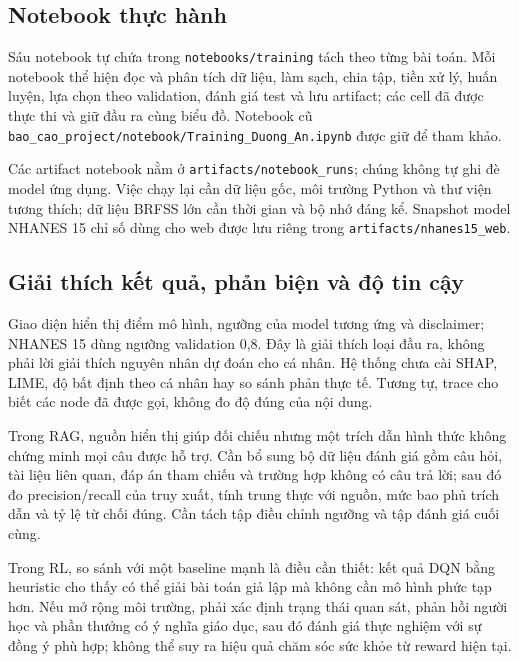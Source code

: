 \subsection{Notebook thực hành}
Sáu notebook tự chứa trong \texttt{notebooks/training} tách theo từng bài toán. Mỗi notebook thể hiện đọc và phân tích dữ liệu, làm sạch, chia tập, tiền xử lý, huấn luyện, lựa chọn theo validation, đánh giá test và lưu artifact; các cell đã được thực thi và giữ đầu ra cùng biểu đồ. Notebook cũ \texttt{bao\_cao\_project/notebook/Training\_Duong\_An.ipynb} được giữ để tham khảo.

Các artifact notebook nằm ở \texttt{artifacts/notebook\_runs}; chúng không tự ghi đè model ứng dụng. Việc chạy lại cần dữ liệu gốc, môi trường Python và thư viện tương thích; dữ liệu BRFSS lớn cần thời gian và bộ nhớ đáng kể. Snapshot model NHANES 15 chỉ số dùng cho web được lưu riêng trong \texttt{artifacts/nhanes15\_web}.

\subsection{Giải thích kết quả, phản biện và độ tin cậy}
Giao diện hiển thị điểm mô hình, ngưỡng của model tương ứng và disclaimer; NHANES 15 dùng ngưỡng validation 0,8. Đây là giải thích loại đầu ra, không phải lời giải thích nguyên nhân dự đoán cho cá nhân. Hệ thống chưa cài SHAP, LIME, độ bất định theo cá nhân hay so sánh phản thực tế. Tương tự, trace cho biết các node đã được gọi, không đo độ đúng của nội dung.

Trong RAG, nguồn hiển thị giúp đối chiếu nhưng một trích dẫn hình thức không chứng minh mọi câu được hỗ trợ. Cần bổ sung bộ dữ liệu đánh giá gồm câu hỏi, tài liệu liên quan, đáp án tham chiếu và trường hợp không có câu trả lời; sau đó đo precision/recall của truy xuất, tính trung thực với nguồn, mức bao phủ trích dẫn và tỷ lệ từ chối đúng. Cần tách tập điều chỉnh ngưỡng và tập đánh giá cuối cùng.

Trong RL, so sánh với một baseline mạnh là điều cần thiết: kết quả DQN bằng heuristic cho thấy có thể giải bài toán giả lập mà không cần mô hình phức tạp hơn. Nếu mở rộng môi trường, phải xác định trạng thái quan sát, phản hồi người học và phần thưởng có ý nghĩa giáo dục, sau đó đánh giá thực nghiệm với sự đồng ý phù hợp; không thể suy ra hiệu quả chăm sóc sức khỏe từ reward hiện tại.
